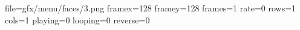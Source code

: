file=gfx/menu/faces/3.png
framex=128
framey=128
frames=1
rate=0
rows=1
cols=1
playing=0
looping=0
reverse=0